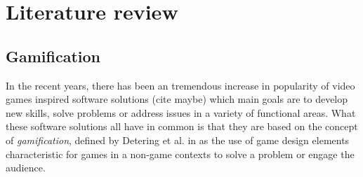 \chapter{Literature review}\label{chapter:gamification}


\section{Gamification}

In the recent years, there has been an tremendous increase in popularity of
video games inspired software solutions (cite maybe) which main goals are to
develop new skills, solve problems or address issues in a variety of
functional areas. What these software solutions all have in common is that they
are based on the concept of \textit{gamification}, defined by Detering et al. in  as the
use of game design elements characteristic for games in a non-game contexts to solve a problem or engage the audience. \cite{knudson2008warm}

